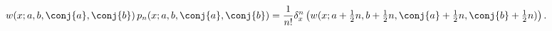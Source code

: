 \[w(x;a,b,\conj{a},\conj{b})\mathop{p_{n}\/}\nolimits\!\left(x;a,b,\conj{a},%
\conj{b}\right)=\frac{1}{n!}\delta_{x}^{n}\left(w(x;a+\tfrac{1}{2}n,b+\tfrac{1%
}{2}n,\conj{a}+\tfrac{1}{2}n,\conj{b}+\tfrac{1}{2}n)\right).\]